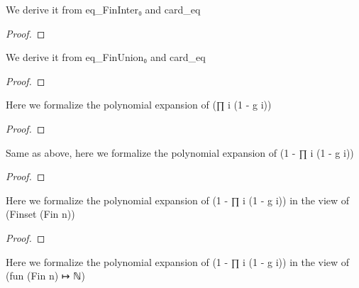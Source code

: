 \begin{lemma}\label{card_eq_FinInter}
        \leanok
                We derive it from eq_FinInter₀ and card_eq
    \end{lemma}

\begin{proof}
    \leanok
\end{proof}

\begin{lemma}\label{card_eq_FinUnion}
        \leanok
                We derive it from eq_FinUnion₀ and card_eq
    \end{lemma}

\begin{proof}
    \leanok
\end{proof}

\begin{lemma}\label{mul_expand₃}
        \leanok
                Here we formalize the polynomial expansion of (∏ i (1 - g i))
    \end{lemma}

\begin{proof}
    \leanok
\end{proof}

\begin{lemma}\label{mul_expand₂}
        \leanok
                Same as above, here we formalize the polynomial expansion of (1 - ∏ i (1 - g i))
    \end{lemma}

\begin{proof}
    \leanok
\end{proof}

\begin{lemma}\label{mul_expand₁}
        \leanok
                Here we formalize the polynomial expansion of (1 - ∏ i (1 - g i)) in the view of (Finset (Fin n))
    \end{lemma}

\begin{proof}
    \leanok
\end{proof}

\begin{lemma}\label{mul_expand₀}
        \leanok
                Here we formalize the polynomial expansion of (1 - ∏ i (1 - g i)) in the view of (fun (Fin n) ↦ ℕ)
    \end{lemma}


